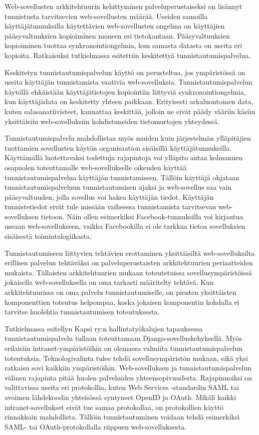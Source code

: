 Web-sovellusten arkkitehtuurin kehittyminen palveluperustaiseksi on lisännyt tunnistusta tarvitsevien web-sovellusten määrää. Useiden samoilla käyttäjätunnuksilla käytettävien web-sovellusten ongelma on käyttäjien pääsyvaltuuksien kopioiminen moneen eri tietokantaan. Pääsyvaltuuksien kopioiminen tuottaa synkronointiongelmia, kun samasta datasta on useita eri kopioita. Ratkaisuksi tutkielmassa esitettiin keskitettyä tunnistautumispalvelua.

Keskitetyn tunnistautumispalvelun käyttö on perusteltua, jos ympäristössä on useita käyttäjän tunnistamista vaativia web-sovelluksia. Tunnistautumispalvelun käytöllä ehkäistään käyttäjätietojen kopiointiin liittyviä synkronointiongelmia, kun käyttäjädata on keskitetty yhteen paikkaan. Erityisesti arkaluontoinen data, kuten salasanatiivisteet, kannattaa keskittää, jolloin ne eivät päädy vääriin käsiin yksittäisiin web-sovelluksiin kohdistuneiden tietomurtojen yhteydessä.

Tunnistautumispalvelu mahdollistaa myös muiden kuin järjestelmän ylläpitäjien tuottamien sovellusten käytön organisaation sisäisillä käyttäjätunnuksilla. Käyttämällä luotettavaksi todettuja rajapintoja voi ylläpito antaa kolmannen osapuolen toteuttamalle web-sovellukselle oikeuden käyttää tunnistautumispalvelua käyttäjän tunnistamiseen. Tällöin käyttäjä ohjataan tunnistautumispalveluun tunnistautumisen ajaksi ja web-sovellus saa vain pääsyvaltuuden, jolla sovellus voi hakea käyttäjän tiedot. Käyttäjän tunnistetiedot eivät tule missään vaiheessa tunnistamista tarvitsevan web-sovelluksen tietoon. Näin ollen esimerkiksi Facebook-tunnuksilla voi kirjautua useaan web-sovellukseen, vaikka Facebookilla ei ole tarkkaa tietoa sovelluksien sisäisestä toimintalogiikasta.

Tunnistautumiseen liittyvien tehtävien erottaminen yksittäisiltä web-sovelluksilta erillisen palvelun tehtäväksi on palveluperustaisten arkkitehtuurien periaatteiden mukaista. Tällaisten arkkitehtuurien mukaan toteutetuissa sovellusympäristöissä jokaisella web-sovelluksella on oma tarkasti määritelty tehtävä. Kun arkkitehtuurissa on oma palvelu tunnistautumiselle, on pienten yksittäisten komponenttien toteutus helpompaa, koska jokaisen komponentin kohdalla ei tarvitse huolehtia tunnistautumisen toteutuksesta.

Tutkielmassa esitellyn Kapsi ry:n hallintatyökalujen tapauksessa tunnistautumispalvelu tullaan toteuttamaan Django-sovelluskehyksellä. Myös erilaisiin intranet-ympäristöihin on olemassa valmiita tunnistautumispalvelun toteutuksia. Teknologivalinta tulee tehdä sovellusympäristön mukaan, eikä yksi ratkaisu sovi kaikkiin ympäristöihin. Web-sovelluksen ja tunnistautumispalvelun välinen rajapinta pitää huolen palveluiden yhteensopivuudesta. Rajapinnoiksi on valittavissa useita eri protokollia, kuten Web Services -standardin SAML tai avoimen lähdekoodin yhteisössä syntyneet OpenID ja OAuth. Mikäli kaikki intranet-sovellukset eivät tue samaa protokollaa, on protokollien käyttö rinnakkain mahdollista. Tällöin tunnistautuminen voidaan tehdä esimerkiksi SAML- tai OAuth-protokollalla riippuen web-sovelluksesta.

